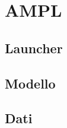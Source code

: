 \documentclass[main.tex]{subfiles}
\begin{document}
\section{AMPL}

\subsection{Launcher}


\subsection{Modello}


\subsection{Dati}

\end{document}

